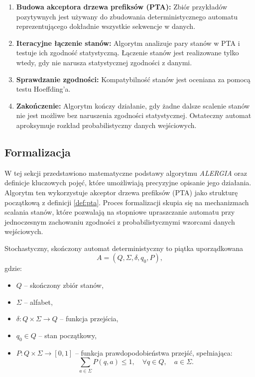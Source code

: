 \begin{enumerate}  
    \item \textbf{Budowa akceptora drzewa prefiksów (PTA):}  
        Zbiór przykładów pozytywnych jest używany do zbudowania deterministycznego automatu reprezentującego dokładnie wszystkie sekwencje w danych.  
    \item \textbf{Iteracyjne łączenie stanów:}  
        Algorytm analizuje pary stanów w PTA i testuje ich zgodność statystyczną. Łączenie stanów jest realizowane tylko wtedy, gdy nie narusza statystycznej zgodności z danymi.  
    \item \textbf{Sprawdzanie zgodności:}  
        Kompatybilność stanów jest oceniana za pomocą testu Hoeffding'a.  
    \item \textbf{Zakończenie:}  
        Algorytm kończy działanie, gdy żadne dalsze scalenie stanów nie jest możliwe bez naruszenia zgodności statystycznej. Ostateczny automat aproksymuje rozkład probabilistyczny danych wejściowych.  
\end{enumerate}


\subsection{Formalizacja}  
W tej sekcji przedstawiono matematyczne podstawy algorytmu \textit{ALERGIA} oraz definicje kluczowych pojęć, które umożliwiają precyzyjne opisanie jego działania. Algorytm ten wykorzystuje akceptor drzewa prefiksów (PTA) jako strukturę początkową z definicji \ref{def:pta}. Proces formalizacji skupia się na mechanizmach scalania stanów, które pozwalają na stopniowe upraszczanie automatu przy jednoczesnym zachowaniu zgodności z probabilistycznymi wzorcami danych wejściowych.  

\begin{definition}[DSFA]  
\label{def:dsfa}
Stochastyczny, skończony automat deterministyczny to piątka uporządkowana
\[ 
A = (Q, \Sigma, \delta, q_0, P), 
\]
gdzie:  
\begin{itemize}  
    \item \( Q \) -- skończony zbiór stanów,  
    \item \( \Sigma \) -- alfabet,  
    \item \( \delta : Q \times \Sigma \to Q \) -- funkcja przejścia,  
    \item \( q_0 \in Q \) -- stan początkowy,  
    \item \( P: Q \times \Sigma \to [0, 1] \) -- funkcja prawdopodobieństwa przejść, spełniająca:  
    \[
    \sum_{a \in \Sigma} P(q, a) \leq 1, \quad \forall q \in Q, \quad a \in \Sigma.
    \]  
\end{itemize}
\end{definition}

